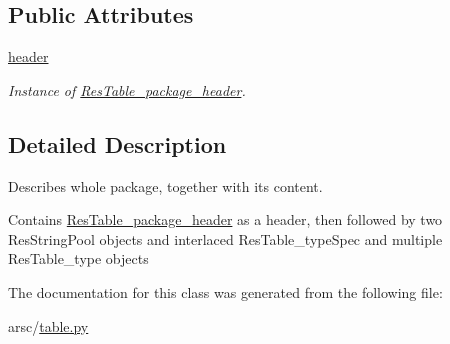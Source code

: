 \subsection*{Public Attributes}
\begin{DoxyCompactItemize}
\item 
\mbox{\label{classtable_1_1ResTable__package_a40423addcd543daa6b34f27a6199fd35}} 
\mbox{\hyperlink{classtable_1_1ResTable__package_a40423addcd543daa6b34f27a6199fd35}{header}}
\begin{DoxyCompactList}\small\item\em Instance of \mbox{\hyperlink{classtable_1_1ResTable__package__header}{Res\+Table\+\_\+package\+\_\+header}}. \end{DoxyCompactList}\end{DoxyCompactItemize}


\subsection{Detailed Description}
Describes whole package, together with its content. 

Contains \mbox{\hyperlink{classtable_1_1ResTable__package__header}{Res\+Table\+\_\+package\+\_\+header}} as a header, then followed by two Res\+String\+Pool objects and interlaced Res\+Table\+\_\+type\+Spec and multiple Res\+Table\+\_\+type objects 

The documentation for this class was generated from the following file\+:\begin{DoxyCompactItemize}
\item 
arsc/\mbox{\hyperlink{table_8py}{table.\+py}}\end{DoxyCompactItemize}
